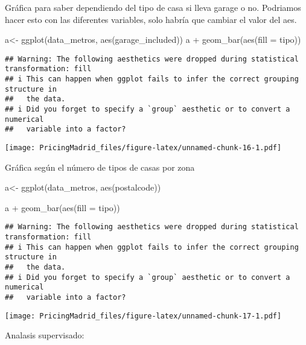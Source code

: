 \documentclass[
]{article}
\newenvironment{Shaded}{\begin{snugshade}}{\end{snugshade}}
\newcommand{\AttributeTok}[1]{\textcolor[rgb]{0.77,0.63,0.00}{#1}}
\newcommand{\FunctionTok}[1]{\textcolor[rgb]{0.00,0.00,0.00}{#1}}
\newcommand{\NormalTok}[1]{#1}
\newcommand{\OtherTok}[1]{\textcolor[rgb]{0.56,0.35,0.01}{#1}}
\newcommand{\SpecialCharTok}[1]{\textcolor[rgb]{0.00,0.00,0.00}{#1}}
\begin{document}
Gráfica para saber dependiendo del tipo de casa si lleva garage o no.
Podriamos hacer esto con las diferentes variables, solo habría que
cambiar el valor del aes.

\begin{Shaded}
\begin{Highlighting}[]
\NormalTok{a}\OtherTok{\textless{}{-}} \FunctionTok{ggplot}\NormalTok{(data\_metros, }\FunctionTok{aes}\NormalTok{(garage\_included)) }
\NormalTok{a }\SpecialCharTok{+} \FunctionTok{geom\_bar}\NormalTok{(}\FunctionTok{aes}\NormalTok{(}\AttributeTok{fill =}\NormalTok{ tipo))}
\end{Highlighting}
\end{Shaded}

\begin{verbatim}
## Warning: The following aesthetics were dropped during statistical transformation: fill
## i This can happen when ggplot fails to infer the correct grouping structure in
##   the data.
## i Did you forget to specify a `group` aesthetic or to convert a numerical
##   variable into a factor?
\end{verbatim}

\texttt{[image: PricingMadrid\_files/figure-latex/unnamed-chunk-16-1.pdf]}

Gráfica según el número de tipos de casas por zona

\begin{Shaded}
\begin{Highlighting}[]
\NormalTok{a}\OtherTok{\textless{}{-}} \FunctionTok{ggplot}\NormalTok{(data\_metros, }\FunctionTok{aes}\NormalTok{(postalcode)) }

\NormalTok{a }\SpecialCharTok{+} \FunctionTok{geom\_bar}\NormalTok{(}\FunctionTok{aes}\NormalTok{(}\AttributeTok{fill =}\NormalTok{ tipo))}
\end{Highlighting}
\end{Shaded}

\begin{verbatim}
## Warning: The following aesthetics were dropped during statistical transformation: fill
## i This can happen when ggplot fails to infer the correct grouping structure in
##   the data.
## i Did you forget to specify a `group` aesthetic or to convert a numerical
##   variable into a factor?
\end{verbatim}

\texttt{[image: PricingMadrid\_files/figure-latex/unnamed-chunk-17-1.pdf]}

Analasis supervisado:
\end{document}
